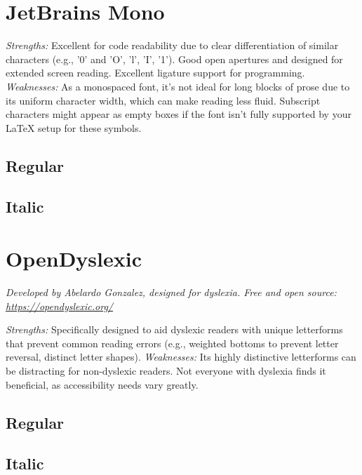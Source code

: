 \begin{raggedright}
\pagebreak
\hypertarget{trouble10}{}\section[JetBrains Mono]{JetBrains Mono\cite{JetBrainsMono}}\label{trouble10}
\begin{raggedright}
\emph{Strengths:} Excellent for code readability due to clear differentiation of similar characters (e.g., '0' and 'O', 'l', 'I', '1'). Good open apertures and designed for extended screen reading. Excellent ligature support for programming.
\emph{Weaknesses:} As a monospaced font, it's not ideal for long blocks of prose due to its uniform character width, which can make reading less fluid. Subscript characters might appear as empty boxes if the font isn't fully supported by your LaTeX setup for these symbols.

\subsection{Regular}
\FontSample{\jetbrainsmonofont}

\subsection{Italic}
\FontSample{{\jetbrainsmonofont\itshape}}
\end{raggedright}




\pagebreak
\section{OpenDyslexic}\label{sec:opendyslexic}
\emph{Developed by Abelardo Gonzalez, designed for dyslexia. Free and open source: \url{https://opendyslexic.org/}}
\begin{raggedright}
\emph{Strengths:} Specifically designed to aid dyslexic readers with unique letterforms that prevent common reading errors (e.g., weighted bottoms to prevent letter reversal, distinct letter shapes).
\emph{Weaknesses:} Its highly distinctive letterforms can be distracting for non-dyslexic readers. Not everyone with dyslexia finds it beneficial, as accessibility needs vary greatly.

\subsection{Regular}
\FontSample{\opendyslexicfont}

\subsection{Italic}
\FontSample{{\opendyslexicfont\itshape}}
\end{raggedright}



\end{raggedright}
